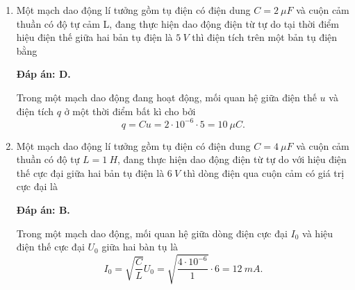 \begin{enumerate}[label=\bfseries Câu \arabic*:]
{	}
	
	\item {}
	
	{Một mạch dao động lí tưởng gồm tụ điện có điện dung $C = \SI{2}{\mu F}$ và cuộn cảm thuần có độ tự cảm L, đang thực hiện dao động điện từ tự do tại thời điểm hiệu điện thế giữa hai bản tụ điện là $\SI{5}{V}$ thì điện tích trên một bản tụ điện bằng
	}
	
	\hideall
	{		\textbf{Đáp án: D.}
		
		Trong một mạch dao động đang hoạt động, mối quan hệ giữa điện thế $u$ và điện tích $q$ ở một thời điểm bất kì cho bởi
		$$
		q=C u=2\cdot10^{-6} \cdot 5=\SI{10}{\mu C}.
		$$
		
	}
	
	\item {}
	
	{Một mạch dao động lí tưởng gồm tụ điện có điện dung $C = \SI{4}{\mu F}$ và cuộn cảm thuần có độ tự $L = \SI{1}{H}$, đang thực hiện dao động điện từ tự do với hiệu điện thế cực đại giữa hai bản tụ điện là $\SI{6}{V}$ thì dòng điện qua cuộn cảm có giá trị cực đại là
	}
	
	\hideall
	{		\textbf{Đáp án: B.}
		
		Trong một mạch dao động, mối quan hệ giữa dòng điện cực đại $I_{0}$ và hiệu điện thế cực đại $U_{0}$ giữa hai bàn tụ là
		$$
		I_{0}=\sqrt{\dfrac{C}{L}} U_{0}=\sqrt{\dfrac{4\cdot10^{-6}}{1}} \cdot 6=  \SI{12}{mA}.
		$$
		
}
\end{enumerate}
